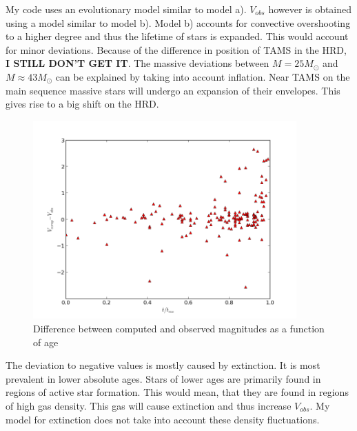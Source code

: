  My code uses an evolutionary model similar to model a). $V_{obs}$ however is obtained using a model similar to model b).
 Model b) accounts for convective overshooting to a higher degree and thus the lifetime of stars is expanded. This would account for
 minor deviations. Because of the difference in position of TAMS in the HRD, \textbf{I STILL DON'T GET IT}.
 The massive deviations between $M=25M_\odot$ and $M\approx 43M_\odot$ can be explained by taking into account inflation. 
 Near TAMS on the main sequence massive stars will undergo an expansion of their envelopes. This gives rise to a big shift on the
 HRD.
 

 
 \begin{figure}[h!]
  \includegraphics[width=0.9\textwidth]{diffmagfracms}
  \caption{Difference between computed and observed magnitudes as a function of age}
 \end{figure}
 
 
 
 The deviation to negative values is mostly caused by extinction. It is most prevalent in lower absolute ages. 
 Stars of lower ages are primarily found in regions of active star formation. This would mean, that they are found in regions
 of high gas density. This gas will cause extinction and thus increase $V_{obs}$. My model for extinction does not take into account 
 these density fluctuations.
 